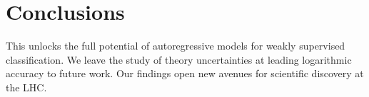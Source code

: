 \section{Conclusions}\label{sec:conclusions}

This unlocks the full potential of autoregressive models for weakly
supervised classification. We leave the study of theory uncertainties at
leading logarithmic accuracy to future work. Our findings open new
avenues for scientific discovery at the LHC.

